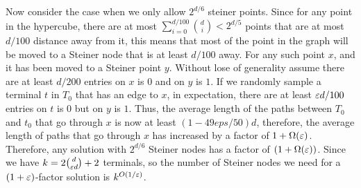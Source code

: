Now consider the case when we only allow $2^{d/6}$ steiner points. Since for any point in the hypercube, there are at most $\sum_{i=0}^{d/100} \binom{d}{i}<2^{d/5}$ points that are at most $d/100$ distance away from it, this means that most of the point in the graph will be moved to a Steiner node that is at least $d/100$ away. For any such point $x$, and it has been moved to a Steiner point $y$. Without lose of generality assume there are at least $d/200$ entries on $x$ is $0$ and on $y$ is $1$. If we randomly sample a terminal $t$ in $T_0$ that has an edge to $x$, in expectation, there are at least ${\varepsilon} d/100$ entries on $t$ is $0$ but on $y$ is $1$. Thus, the average length of the paths between $T_0$ and $t_0$ that go through $x$ is now at least $(1-49eps/50)d$, therefore, the average length of paths that go through $x$ has increased by a factor of $1+\Omega({\varepsilon})$. Therefore, any solution with $2^{d/6}$ Steiner nodes has a factor of $(1+\Omega({\varepsilon}))$. Since we have $k = 2\binom{d}{{\varepsilon} d}+2$ terminals, so the number of Steiner nodes we need for a $(1+{\varepsilon})$-factor solution is $k^{O(1/{\varepsilon})}$.

\fi
